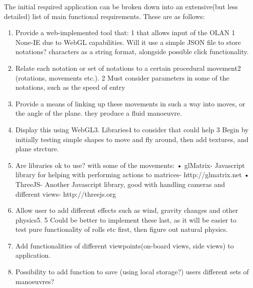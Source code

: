 \noindent The initial required application can be broken down into an extensive(but less detailed) list of main functional requirements. These are as follows:
\begin{enumerate}
	\item Provide a web-implemented tool that: 1 that allows input of the OLAN 1 None-IE due to WebGL capabilities. Will it use a simple JSON file to store notations? characters as a string format, alongside possible click functionality.
	\item Relate each notation or set of notations to a certain procedural
movement2 (rotations, movements etc.). 2 Must consider parameters in some of
the notations, such as the speed of entry
	\item Provide a means of linking up these movements in such a way into moves, or the angle of the plane.
they produce a fluid manoeuvre.
	\item Display this using WebGL3. Libraries4 to consider that could help 3 Begin by initially testing simple shapes
to move and fly around, then add
textures, and plane strcture.
	\item Are libraries ok to use?
with some of the movements:
• glMatrix- Javascript library for helping with performing actions
to matrices- http://glmatrix.net
• ThreeJS- Another Javascript library, good with handling cameras
and different views- http://threejs.org
	\item Allow user to add different effects such as wind, gravity changes
and other physics5. 5 Could be better to implement these
last, as it will be easier to test pure
functionality of rolls etc first, then
figure out natural physics.
	\item Add functionalities of different viewpoints(on-board views, side
views) to application.
	\item Possibility to add function to save (using local storage?) users
different sets of manoeuvres?
\end{enumerate}

